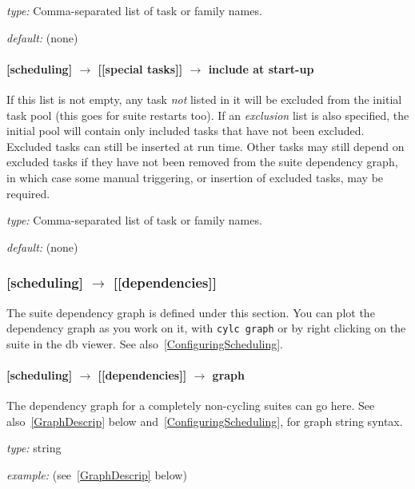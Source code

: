 \begin{myitemize}
    \item {\em type:} Comma-separated list of task or family names.
    \item {\em default:} (none)
\end{myitemize}

\paragraph[include at start-up]{[scheduling] $\rightarrow$ [[special tasks]] $\rightarrow$ include at start-up}
\label{IASU}

If this list is not empty, any task {\em not} listed in it will be
excluded from the initial task pool (this goes for suite restarts too).
If an {\em exclusion} list is also specified, the initial pool will
contain only included tasks that have not been excluded. Excluded tasks
can still be inserted at run time. Other tasks may still depend on
excluded tasks if they have not been removed from the suite dependency
graph, in which case some manual triggering, or insertion of excluded
tasks, may be required.

\begin{myitemize}
    \item {\em type:} Comma-separated list of task or family names.
    \item {\em default:} (none)
\end{myitemize}

\subsubsection[{[[}dependencies{]]}]{[scheduling] $\rightarrow$ [[dependencies]]}

The suite dependency graph is defined under this section.  You can plot
the dependency graph as you work on it, with \lstinline=cylc graph= or
by right clicking on the suite in the db viewer.  See
also~\ref{ConfiguringScheduling}.

\paragraph[graph]{ [scheduling] $\rightarrow$ [[dependencies]] $\rightarrow$ graph }

The dependency graph for a completely non-cycling suites can go here.
See also~\ref{GraphDescrip} below and~\ref{ConfiguringScheduling}, for graph
string syntax.
\begin{myitemize}
    \item {\em type:} string
    \item {\em example:} (see~\ref{GraphDescrip} below)
\end{myitemize}

